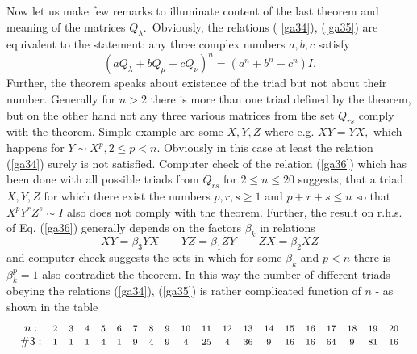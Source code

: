 \documentclass[a4paper,a4paper]{article}
\begin{document}
Now let us make few remarks to illuminate content of the last theorem and
meaning of the matrices $Q_{\lambda }$.\textit{\ }Obviously, the relations (%
\ref{ga34}), (\ref{ga35}) are equivalent to the statement: any three complex
numbers $a,b,c$ satisfy 
\begin{equation}
(aQ_{\lambda }+bQ_{\mu }+cQ_{\nu })^{n}=(a^{n}+b^{n}+c^{n})I.  \label{ga37}
\end{equation}%
Further, the theorem speaks about existence of the triad but not about their
number. Generally for $n>2$ there is more than one triad defined by the
theorem, but on the other hand not any three various matrices from the set $%
Q_{rs}$ comply with the theorem. Simple example are some $X,Y,Z$ where e.g. $%
XY=YX,$ which happens for $Y\sim X^{p},2\leq p<n$. Obviously in this case at
least the relation (\ref{ga34}) surely is not satisfied. Computer check of
the relation (\ref{ga36}) which has been done with all possible triads from $%
Q_{rs}$ for $2\leq n\leq 20$ suggests, that a triad $X,Y,Z$ for which there
exist the numbers $p,r,s\geq 1$ and $p+r+s\leq n$ so that $%
X^{p}Y^{r}Z^{s}\sim I$ also does not comply with the theorem. Further, the
result on r.h.s. of Eq. (\ref{ga36}) generally depends on the factors $\beta
_{k}$ in relations 
\begin{equation}
XY=\beta _{3}YX\qquad YZ=\beta _{1}ZY\qquad ZX=\beta _{2}XZ  \label{gaa37}
\end{equation}%
and computer check suggests the sets in which for some $\beta _{k}$ and $p<n$
there is $\beta _{k}^{p}=1$ also contradict the theorem. In this way the
number of different triads obeying the relations (\ref{ga34}), (\ref{ga35})
is rather complicated function of $n$ - as shown in the table 
\begin{equation*}
\begin{array}{cccccccccccccccccccc}
n: & \text{{\footnotesize 2}} & \text{{\footnotesize 3}} & \text{%
{\footnotesize 4}} & \text{{\footnotesize 5}} & \text{{\footnotesize 6}} & 
\text{{\footnotesize 7}} & \text{{\footnotesize 8}} & \text{{\footnotesize 9}%
} & \text{{\footnotesize 10}} & \text{{\footnotesize 11}} & \text{%
{\footnotesize 12}} & \text{{\footnotesize 13}} & \text{{\footnotesize 14}}
& \text{{\footnotesize 15}} & \text{{\footnotesize 16}} & \text{%
{\footnotesize 17}} & \text{{\footnotesize 18}} & \text{{\footnotesize 19}}
& \text{{\footnotesize 20}} \\ 
\#3: & \text{{\footnotesize 1}} & \text{{\footnotesize 1}} & \text{%
{\footnotesize 1}} & \text{{\footnotesize 4}} & \text{{\footnotesize 1}} & 
\text{{\footnotesize 9}} & \text{{\footnotesize 4}} & \text{{\footnotesize 9}%
} & \text{{\footnotesize 4}} & \text{{\footnotesize 25}} & \text{%
{\footnotesize 4}} & \text{{\footnotesize 36}} & \text{{\footnotesize 9}} & 
\text{{\footnotesize 16}} & \text{{\footnotesize 16}} & \text{{\footnotesize %
64}} & \text{{\footnotesize 9}} & \text{{\footnotesize 81}} & \text{%
{\footnotesize 16}}%
\end{array}%
\end{equation*}%
\end{document}
